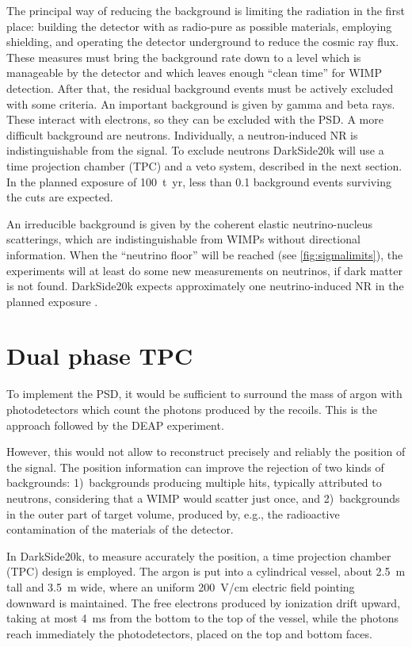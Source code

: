 The principal way of reducing the background is limiting the radiation in the
first place: building the detector with as radio-pure as possible materials,
employing shielding, and operating the detector underground to reduce the
cosmic ray flux. These measures must bring the background rate down to a level
which is manageable by the detector and which leaves enough ``clean time'' for
WIMP detection. After that, the residual background events must be actively
excluded with some criteria. An important background is given by gamma and beta
rays. These interact with electrons, so they can be excluded with the PSD. A
more difficult background are neutrons. Individually, a neutron-induced NR is
indistinguishable from the signal. To exclude neutrons DarkSide20k will use a
time projection chamber (TPC) and a veto system, described in the next section.
In the planned exposure of \SI{100}{t yr}, less than 0.1 background events
surviving the cuts are expected.

An irreducible background is given by the coherent elastic neutrino-nucleus
scatterings, which are indistinguishable from WIMPs without directional
information. When the ``neutrino floor'' will be reached (see
\autoref{fig:sigmalimits}), the experiments will at least do some new
measurements on neutrinos, if dark matter is not found. DarkSide20k expects
approximately one neutrino-induced NR in the planned exposure
\cite[119]{aalseth2018}.

\section{Dual phase TPC}

To implement the PSD, it would be sufficient to surround the mass of argon with
photodetectors which count the photons produced by the recoils. This is the
approach followed by the DEAP experiment.

However, this would not allow to reconstruct precisely and reliably the
position of the signal. The position information can improve the rejection of
two kinds of backgrounds: 1)~backgrounds producing multiple hits, typically
attributed to neutrons, considering that a WIMP would scatter just once, and
2)~backgrounds in the outer part of target volume, produced by, e.g., the
radioactive contamination of the materials of the detector.

In DarkSide20k, to measure accurately the position, a time projection chamber
(TPC) design is employed. The argon is put into a cylindrical vessel, about
\SI{2.5}{m} tall and \SI{3.5}{m} wide, where an uniform \SI{200}{V/cm} electric
field pointing downward is maintained. The free electrons produced by
ionization drift upward, taking at most \SI{4}{ms} from the bottom to the top
of the vessel, while the photons reach immediately the photodetectors, placed
on the top and bottom faces.

